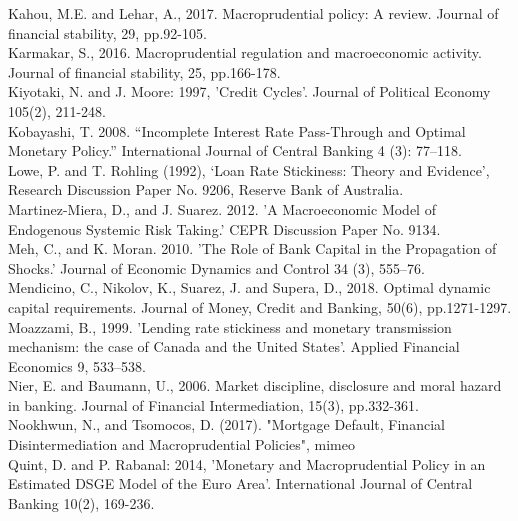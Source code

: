 \documentclass[12pt]{article}
\numberwithin{equation}{section}
\begin{document}
Kahou, M.E. and Lehar, A., 2017. Macroprudential policy: A review. Journal of financial stability, 29, pp.92-105.\\

Karmakar, S., 2016. Macroprudential regulation and macroeconomic activity. Journal of financial stability, 25, pp.166-178.\\

Kiyotaki, N. and J. Moore: 1997, 'Credit Cycles'. Journal of Political Economy
105(2), 211-248.\\

Kobayashi, T. 2008. “Incomplete Interest Rate Pass-Through and
Optimal Monetary Policy.” International Journal of Central
Banking 4 (3): 77–118.\\




Lowe, P. and T. Rohling (1992), ‘Loan Rate Stickiness: Theory and Evidence’, Research Discussion Paper No. 9206, Reserve Bank of Australia.\\

Martinez-Miera, D., and J. Suarez. 2012. 'A Macroeconomic Model
of Endogenous Systemic Risk Taking.' CEPR Discussion Paper
No. 9134.\\

Meh, C., and K. Moran. 2010. 'The Role of Bank Capital in the
Propagation of Shocks.' Journal of Economic Dynamics and
Control 34 (3), 555–76.\\

Mendicino, C., Nikolov, K., Suarez, J. and Supera, D., 2018. Optimal dynamic capital requirements. Journal of Money, Credit and Banking, 50(6), pp.1271-1297.\\

Moazzami, B., 1999. 'Lending rate stickiness and monetary transmission mechanism: the case of Canada and the United States'.
Applied Financial Economics 9, 533–538.\\


Nier, E. and Baumann, U., 2006. Market discipline, disclosure and moral hazard in banking. Journal of Financial Intermediation, 15(3), pp.332-361. \\

Nookhwun, N., and Tsomocos, D. (2017). "Mortgage Default, Financial Disintermediation and
Macroprudential Policies", mimeo
\\




Quint, D. and P. Rabanal: 2014, 'Monetary and Macroprudential Policy in an Estimated
DSGE Model of the Euro Area'. International Journal of Central Banking
10(2), 169-236.\\
\end{document}
